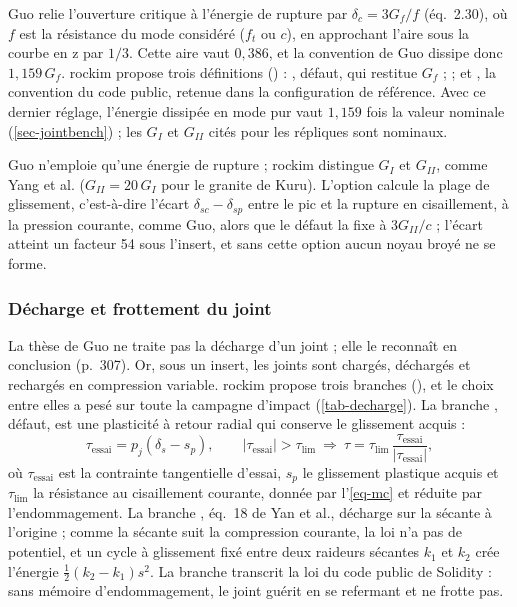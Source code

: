 Guo relie l'ouverture critique à l'énergie de rupture par $\delta_c = 3 G_f/f$ (éq.~{2.30}), où $f$ est la résistance du mode considéré ($f_t$ ou $c$), en approchant l'aire sous la courbe en z par $1/3$. Cette aire vaut $0{,}386$, et la convention de Guo dissipe donc $1{,}159\,G_f$. rockim propose trois définitions () : , défaut, qui restitue $G_f$ ;  ; et , la convention du code public, retenue dans la configuration de référence. Avec ce dernier réglage, l'énergie dissipée en mode pur vaut $1{,}159$ fois la valeur nominale (\cref{sec-jointbench}) ; les $G_I$ et $G_{II}$ cités pour les répliques sont nominaux.

Guo n'emploie qu'une énergie de rupture ; rockim distingue $G_I$ et $G_{II}$, comme Yang et al. ($G_{II} = 20\,G_I$ pour le granite de Kuru). L'option  calcule la plage de glissement, c'est-à-dire l'écart $\delta_{sc} - \delta_{sp}$ entre le pic et la rupture en cisaillement, à la pression courante, comme Guo, alors que le défaut la fixe à $3G_{II}/c$ ; l'écart atteint un facteur 54 sous l'insert, et sans cette option aucun noyau broyé ne se forme.

\subsubsection{Décharge et frottement du joint}
\label{sec-decharge}

La thèse de Guo ne traite pas la décharge d'un joint ; elle le reconnaît en conclusion (p.~307). Or, sous un insert, les joints sont chargés, déchargés et rechargés en compression variable. rockim propose trois branches (), et le choix entre elles a pesé sur toute la campagne d'impact (\cref{tab-decharge}). La branche , défaut, est une plasticité à retour radial qui conserve le glissement acquis :
\begin{equation}
\tau_\text{essai} = p_j(\delta_s - s_p), \qquad |\tau_\text{essai}| > \tau_\text{lim} \ \Rightarrow\ \tau = \tau_\text{lim}\,\frac{\tau_\text{essai}}{|\tau_\text{essai}|} ,
\label{eq-plastic}
\end{equation}
où $\tau_\text{essai}$ est la contrainte tangentielle d'essai, $s_p$ le glissement plastique acquis et $\tau_\text{lim}$ la résistance au cisaillement courante, donnée par l'\cref{eq-mc} et réduite par l'endommagement. La branche , éq.~18 de Yan et al., décharge sur la sécante à l'origine ; comme la sécante suit la compression courante, la loi n'a pas de potentiel, et un cycle à glissement fixé entre deux raideurs sécantes $k_1$ et $k_2$ crée l'énergie $\frac12(k_2 - k_1)s^2$. La branche  transcrit la loi du code public de Solidity : sans mémoire d'endommagement, le joint guérit en se refermant et ne frotte pas.

